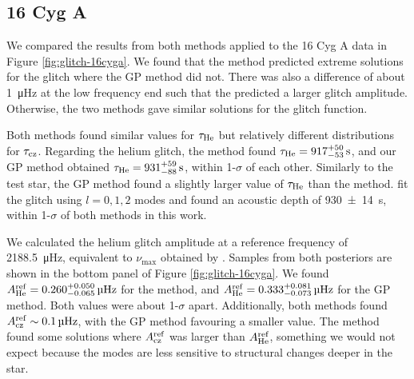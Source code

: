 
\subsection{16 Cyg A}

We compared the results from both methods applied to the 16 Cyg A data in Figure \ref{fig:glitch-16cyga}. We found that the  method predicted extreme solutions for the glitch where the GP method did not. There was also a difference of about \SI{1}{\micro\hertz} at the low frequency end such that the  predicted a larger glitch amplitude. Otherwise, the two methods gave similar solutions for the glitch function.

Both methods found similar values for \(\tau_{{\mathrm{He}}}\) but relatively different distributions for \(\tau_{{\mathrm{cz}}}\). Regarding the helium glitch, the  method found \(\tau_{{\mathrm{He}}} = 917_{-53}^{+50} \, \mathrm{s}\), and our GP method obtained \(\tau_{{\mathrm{He}}} = 931_{-88}^{+59} \, \mathrm{s}\), within 1-\(\sigma\) of each other. Similarly to the test star, the GP method found a slightly larger value of \(\tau_{{\mathrm{He}}}\) than the  method. \citet{Verma.Faria.ea2014} fit the glitch using \(l=0,1,2\) modes and found an acoustic depth of \SI{930(14)}{\second}, within 1-\(\sigma\) of both methods in this work.

We calculated the helium glitch amplitude at a reference frequency of \SI{2188.5}{\micro\hertz}, equivalent to \(\nu_{\max}\) obtained by \citet{Lund.SilvaAguirre.ea2017}. Samples from both posteriors are shown in the bottom panel of Figure \ref{fig:glitch-16cyga}. We found \(A_{{\mathrm{He}}}^\mathrm{ref} = 0.260_{-0.065}^{+0.050}\,\si{\micro\hertz}\) for the  method, and \(A_{{\mathrm{He}}}^\mathrm{ref} = 0.333_{-0.073}^{+0.081}\,\si{\micro\hertz}\) for the GP method. Both values were about 1-\(\sigma\) apart. Additionally, both methods found \(A_{{\mathrm{cz}}}^\mathrm{ref} \sim 0.1\,\si{\micro\hertz}\), with the GP method favouring a smaller value. The  method found some solutions where \(A_{{\mathrm{cz}}}^\mathrm{ref}\) was larger than \(A_{{\mathrm{He}}}^\mathrm{ref}\), something we would not expect because the modes are less sensitive to structural changes deeper in the star.

